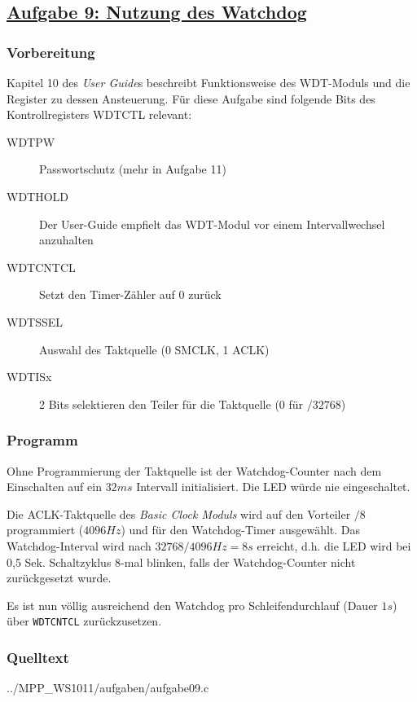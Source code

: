\subsection*
{\href{http://cst.mi.fu-berlin.de/intern/19606-P-MPP/Aufgaben/040301.html}
{Aufgabe 9: Nutzung des Watchdog}}

\subsubsection*{Vorbereitung}

Kapitel 10 des \emph{User Guide}s beschreibt Funktionsweise des
WDT-Moduls und die Register zu dessen Ansteuerung. Für diese Aufgabe
sind folgende Bits des Kontrollregisters WDTCTL relevant:

\begin{description}
    \item [WDTPW]    Passwortschutz (mehr in Aufgabe 11)
    \item [WDTHOLD]  Der User-Guide empfielt das WDT-Modul vor einem
Intervallwechsel anzuhalten
    \item [WDTCNTCL] Setzt den Timer-Zähler auf
0 zurück \item [WDTSSEL]  Auswahl des Taktquelle (0 SMCLK, 1 ACLK)
    \item [WDTISx]   2 Bits selektieren den Teiler für die Taktquelle (0 für
$/32768$) \end{description}

\subsubsection*{Programm}

Ohne Programmierung der Taktquelle ist der Watchdog-Counter nach dem
Einschalten auf ein $32 ms$ Intervall initialisiert. Die LED würde nie
eingeschaltet.

Die ACLK-Taktquelle des \emph{Basic Clock Moduls} wird auf den Vorteiler
$/8$ programmiert ($4096 Hz$) und für den Watchdog-Timer ausgewählt. Das
Watchdog-Interval wird nach $32768 / 4096 Hz = 8 s$ erreicht, d.h. die
LED wird bei 0,5 Sek. Schaltzyklus 8-mal blinken, falls der
Watchdog-Counter nicht zurückgesetzt wurde.

Es ist nun völlig ausreichend den Watchdog pro Schleifendurchlauf (Dauer
$1 s$) über \texttt{WDTCNTCL} zurückzusetzen.

\subsubsection*{Quelltext}


{../MPP_WS1011/aufgaben/aufgabe09.c}
